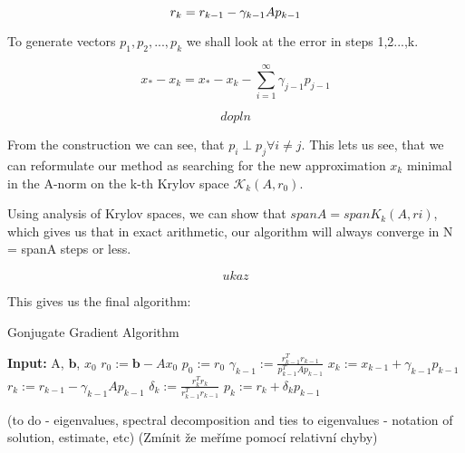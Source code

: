 \begin{equation}
    r_k = r_{k-1} - \gamma_{k-1}Ap_{k-1}\\
\end{equation}

To generate vectors \(p_1,p_2,...,p_k\) we shall look at the error in steps 1,2...,k. 

\[x_*-x_k = x_* - x_k - \sum_{i=1}^{\infty}\gamma_{j-1} p_{j-1}\]

\[dopln\]

From the construction we can see, that \(p_i \perp p_j \forall i\neq j\). This lets us see, that we can reformulate our method as searching for the new approximation \(x_k\) minimal in the A-norm on the k-th Krylov space \(\mathcal{K}_k(A,r_0)\).

Using analysis of Krylov spaces, we can show that \(span{A} = span{K_k(A,ri)}\), which gives us that in exact arithmetic, our algorithm will always converge in N = span{A} steps or less.

\[ukaz\]

\newpage
This gives us the final algorithm:
\begin{algorithm}
\caption{Gonjugate Gradient Algorithm}
\begin{algorithmic}[1]
    \STATE \textbf{Input:} A, $\boldsymbol{b}$, $x_0$
    \STATE $r_0 := \boldsymbol{b} - Ax_0$
    \STATE $p_0 := r_0$
        \STATE $\gamma_{k-1} := \frac{r_{k-1}^T r_{k-1}}{p_{k-1}^T A p_{k-1}}$
        \STATE $x_k := x_{k-1} + \gamma_{k-1} p_{k-1}$
        \STATE $r_k := r_{k-1} - \gamma_{k-1} A p_{k-1}$
        \STATE $\delta_k := \frac{r_k^T r_k}{r_{k-1}^T r_{k-1}}$
        \STATE $p_k := r_k + \delta_k p_{k-1}$
    \ENDFOR
\end{algorithmic}
\end{algorithm}

    

(to do - eigenvalues, spectral decomposition and ties to eigenvalues
- notation of solution, estimate, etc)
(Zmínit že meříme pomocí relativní chyby)